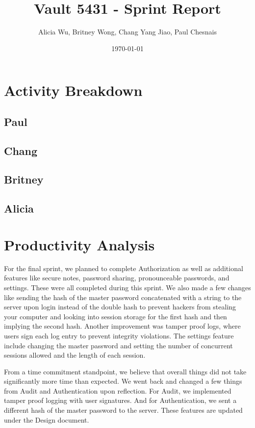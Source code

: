 \documentclass{article}
\title{Vault 5431 - Sprint Report}
\author{Alicia Wu, Britney Wong, Chang Yang Jiao, Paul Chesnais}
\date{\today}
\begin{document}
\maketitle
\thispagestyle{empty}

\section{Activity Breakdown}
\subsection{Paul}
\par

\subsection{Chang}
\par

\subsection{Britney}
\par

\subsection{Alicia}
\par

\section{Productivity Analysis}
\par For the final sprint, we planned to complete Authorization as well as additional features like secure notes, password sharing, pronounceable passwords, and settings. These were all completed during this sprint. We also made a few changes like sending the hash of the master password concatenated with a string to the server upon login instead of the double hash to prevent hackers from stealing your computer and looking into session storage for the first hash and then implying the second hash. Another improvement was tamper proof logs, where users sign each log entry to prevent integrity violations. The settings feature include changing the master password and setting the number of concurrent sessions allowed and the length of each session.

\par From a time commitment standpoint, we believe that overall things did not take significantly more time than expected. We went back and changed a few things from Audit and Authentication upon reflection. For Audit, we implemented tamper proof logging with user signatures. And for Authentication, we sent a different hash of the master password to the server. These features are updated under the Design document.
\end{document}
